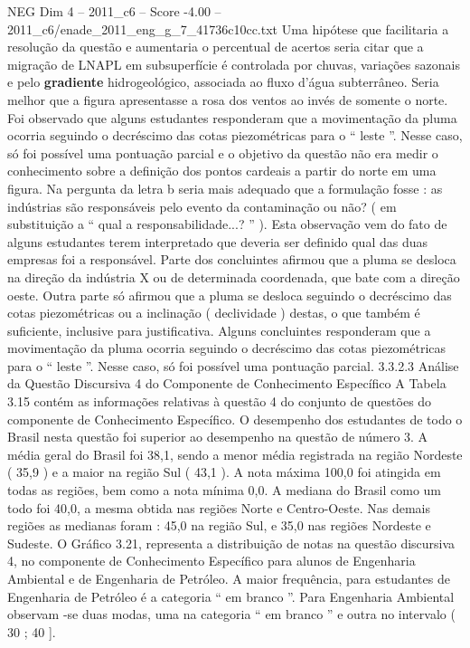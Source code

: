 \begin{textsample}{NEG Dim 4 – 2011\_c6 – Score -4.00 – 2011\_c6/enade\_2011\_eng\_g\_7\_41736c10cc.txt}
Uma hipótese que facilitaria a resolução da questão e aumentaria o percentual de acertos seria citar que a migração de LNAPL em subsuperfície é controlada por chuvas, variações sazonais e pelo \textbf{gradiente} hidrogeológico, associada ao fluxo d’água subterrâneo.
Seria melhor que a figura apresentasse a rosa dos ventos ao invés de somente o norte.
Foi observado que alguns estudantes responderam que a movimentação da pluma ocorria seguindo o decréscimo das cotas piezométricas para o “ leste ”.
Nesse caso, só foi possível uma pontuação parcial e o objetivo da questão não era medir o conhecimento sobre a definição dos pontos cardeais a partir do norte em uma figura.
Na pergunta da letra b seria mais adequado que a formulação fosse : as indústrias são responsáveis pelo evento da contaminação ou não? ( em substituição a “ qual a responsabilidade...? ” ).
Esta observação vem do fato de alguns estudantes terem interpretado que deveria ser definido qual das duas empresas foi a responsável.
Parte dos concluintes afirmou que a pluma se desloca na direção da indústria X ou de determinada coordenada, que bate com a direção oeste.
Outra parte só afirmou que a pluma se desloca seguindo o decréscimo das cotas piezométricas ou a inclinação ( declividade ) destas, o que também é suficiente, inclusive para justificativa.
Alguns concluintes responderam que a movimentação da pluma ocorria seguindo o decréscimo das cotas piezométricas para o “ leste ”.
Nesse caso, só foi possível uma pontuação parcial. 3.3.2.3 Análise da Questão Discursiva 4 do Componente de Conhecimento Específico A Tabela 3.15 contém as informações relativas à questão 4 do conjunto de questões do componente de Conhecimento Específico.
O desempenho dos estudantes de todo o Brasil nesta questão foi superior ao desempenho na questão de número 3.
A média geral do Brasil foi 38,1, sendo a menor média registrada na região Nordeste ( 35,9 ) e a maior na região Sul ( 43,1 ).
A nota máxima 100,0 foi atingida em todas as regiões, bem como a nota mínima 0,0.
A mediana do Brasil como um todo foi 40,0, a mesma obtida nas regiões Norte e Centro-Oeste.
Nas demais regiões as medianas foram : 45,0 na região Sul, e 35,0 nas regiões Nordeste e Sudeste.
O Gráfico 3.21, representa a distribuição de notas na questão discursiva 4, no componente de Conhecimento Específico para alunos de Engenharia Ambiental e de Engenharia de Petróleo.
A maior frequência, para estudantes de Engenharia de Petróleo é a categoria “ em branco ”.
Para Engenharia Ambiental observam -se duas modas, uma na categoria “ em branco ” e outra no intervalo ( 30 ; 40 ].

\end{textsample}
